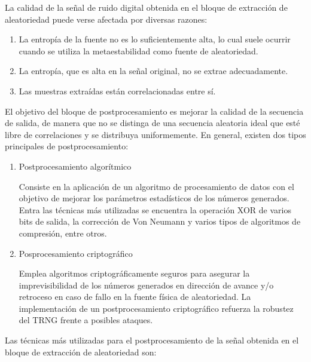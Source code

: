             La calidad de la señal de ruido digital obtenida en el bloque de extracción de aleatoriedad puede verse afectada por diversas razones:

            \begin{enumerate}[noitemsep, label=(\alph*)]
                \item La entropía de la fuente no es lo suficientemente alta, lo cual suele ocurrir cuando se utiliza la metaestabilidad como fuente de aleatoriedad.
                \item La entropía, que es alta en la señal original, no se extrae adecuadamente.
                \item Las muestras extraídas están correlacionadas entre sí. 
            \end{enumerate}		

	
	        El objetivo del bloque de postprocesamiento es mejorar la calidad de la secuencia de salida, de manera que no se distinga de una secuencia aleatoria ideal que esté libre de correlaciones y se distribuya uniformemente. En general, existen dos tipos principales de postprocesamiento:

            \begin{enumerate}
                \item Postprocesamiento algorítmico

                    Consiste en la aplicación de un algoritmo de procesamiento de datos con el objetivo de mejorar los parámetros estadísticos de los números generados. Entra las técnicas más utilizadas se encuentra la operación XOR de varios bits de salida, la corrección de Von Neumann y varios tipos de algoritmos de compresión, entre otros.
                \item Posprocesamiento criptográfico 

                    Emplea algoritmos criptográficamente seguros para asegurar la imprevisibilidad de los números generados en dirección de avance y/o retroceso en caso de fallo en la fuente física de aleatoriedad. La implementación de un postprocesamiento criptográfico refuerza la robustez del TRNG frente a posibles ataques.
            \end{enumerate}
    
            Las técnicas más utilizadas para el postprocesamiento de la señal obtenida en el bloque de extracción de aleatoriedad son: 
	
